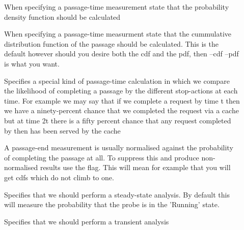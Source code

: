 \begin{description}
\item[ ]
When specifying a passage-time measurement state that the
probability density function should be calculated

\end{description}

\begin{description}
\item[ ]
When specifying a passage-time measurment state that
the cummulative distribution function of the passage
should be calculated.
This is the default however should you desire both the cdf
and the pdf, then --cdf --pdf is what you want.

\end{description}

\begin{description}
\item[ ]
Specifies a special kind of passage-time calculation
in which we compare the likelihood of completing a passage
by the different stop-actions at each time.
For example we may say that if we complete a request by
time t then we have a ninety-percent chance that we
completed the request via a cache but at time 2t there is a
fifty percent chance that any request completed by then has
been served by the cache

\end{description}

\begin{description}
\item[ ]
A passage-end measurement is usually normalised against
the probability of completing the passage at all.
To suppress this and produce non-normalised results use
the  flag.
This will mean for example that you will get cdfs which
do not climb to one.

\end{description}

\begin{description}
\item[ ]
Specifies that we should perform a steady-state analysis.
By default this will measure the probability that the probe
is in the 'Running' state.

\end{description}

\begin{description}
\item[ ]
Specifies that we should perform a transient analysis

\end{description}

